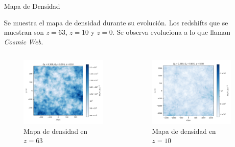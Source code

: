 \documentclass{beamer}
\begin{document}
\begin{frame}{Mapa de Densidad}

	\small Se muestra el mapa de densidad durante su evolución.  Los redshifts que se muestran son $z=63$, $z=10$ y $z=0$. Se observa evoluciona a lo que llaman \textit{Cosmic Web}.

	\begin{columns}[t]

		\begin{column}{0.33\textwidth}
			
			\begin{figure}
				\includegraphics[scale=0.2]{RunCanonica/RunCanonZ63Rho.png}
				\caption{\footnotesize Mapa de densidad en $z=63$}
			\end{figure}

		\end{column}

		\begin{column}{0.33\textwidth}
			
			\begin{figure}
				\includegraphics[scale=0.2]{RunCanonica/RunCanonZ10Rho.png}
				\caption{\footnotesize Mapa de densidad en $z=10$}
			\end{figure}


\end{column}
\end{columns}
\end{frame}
\end{document}
